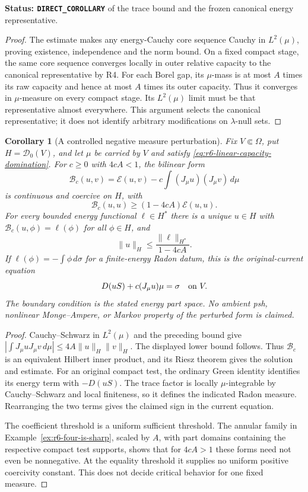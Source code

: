 \documentclass[11pt,a4paper]{article}
\numberwithin{equation}{section}
\newtheorem{corollary}[theorem]{Corollary}
\theoremstyle{definition}
\theoremstyle{remark}
\begin{document}
\noindent\textbf{Status: \texttt{DIRECT\_COROLLARY}} of the trace bound
and the frozen canonical energy representative.

\begin{proof}
The estimate makes any energy-Cauchy core sequence Cauchy in
$L^2(\mu)$, proving existence, independence and the norm bound.
On a fixed compact stage, the same core sequence converges locally in
outer relative capacity to the canonical representative by R4.
For each Borel gap, its $\mu$-mass is at most $A$ times its raw capacity
and hence at most $A$ times its outer capacity. Thus it converges in
$\mu$-measure on every compact stage. Its $L^2(\mu)$ limit must be
that representative almost everywhere. This argument selects the
canonical representative; it does not identify arbitrary modifications
on $\lambda$-null sets.
\end{proof}

\begin{corollary}[A controlled negative measure perturbation]
\label{cor:r6-form-small-measure-potential}
Fix $V\Subset\Omega$, put $H=\mathscr D_0(V)$, and let $\mu$ be
carried by $V$ and satisfy \eqref{eq:r6-linear-capacity-domination}.
For $c\ge0$ with $4cA<1$, the bilinear form
\[
        \mathcal B_c(u,v)=\mathcal E(u,v)
                              -c\int (J_\mu u)(J_\mu v)\,d\mu
\]
is continuous and coercive on $H$, with
\[
              \mathcal B_c(u,u)\ge(1-4cA)\mathcal E(u,u).
\]
For every bounded energy functional $\ell\in H^*$ there is a unique
$u\in H$ with $\mathcal B_c(u,\phi)=\ell(\phi)$ for all $\phi\in H$,
and
\[
                      \|u\|_H\le\frac{\|\ell\|_{H^*}}{1-4cA}.
\]
If $\ell(\phi)=-\int\phi\,d\sigma$ for a finite-energy Radon datum,
this is the original-current equation
\[
                         D(uS)+c(J_\mu u)\mu=\sigma
                                                    \quad\hbox{on }V.
\]
The boundary condition is the stated energy part space. No ambient
psh, nonlinear Monge--Ampere, or Markov property of the perturbed form
is claimed.
\end{corollary}

\begin{proof}
Cauchy--Schwarz in $L^2(\mu)$ and the preceding bound give
$|\int J_\mu uJ_\mu v\,d\mu|\le4A\|u\|_H\|v\|_H$.
The displayed lower bound follows. Thus $\mathcal B_c$ is an
equivalent Hilbert inner product, and its Riesz theorem gives the
solution and estimate. For an original compact test, the ordinary
Green identity identifies its energy term with $-D(uS)$.
The trace factor is locally $\mu$-integrable by Cauchy--Schwarz and
local finiteness, so it defines the indicated Radon measure. Rearranging
the two terms gives the claimed sign in the current equation.

The coefficient threshold is a uniform sufficient threshold. The
annular family in Example~\ref{ex:r6-four-is-sharp}, scaled by $A$,
with part domains containing the respective compact test supports,
shows that for $4cA>1$ these forms need not even be nonnegative.
At the equality threshold it supplies no uniform positive coercivity
constant. This does not decide critical behavior for one fixed measure.
\end{proof}
\end{document}
